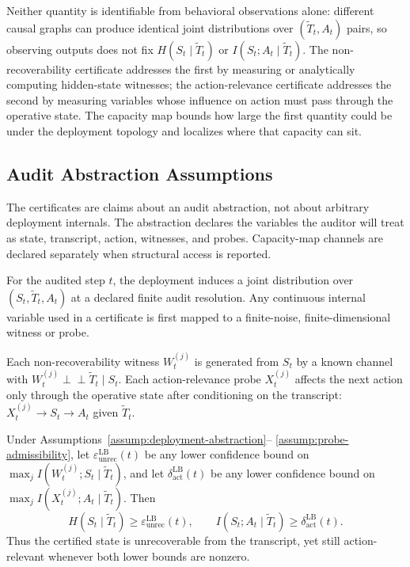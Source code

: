   Neither quantity is identifiable from behavioral observations alone: different
   causal graphs can produce identical joint distributions over $(\tilde T_t,
  A_t)$ pairs, so observing outputs does not fix $H(S_t \mid \tilde T_t)$ or
  $I(S_t; A_t \mid \tilde T_t)$. The non-recoverability certificate addresses
  the first by measuring or analytically computing hidden-state witnesses; the
  action-relevance certificate addresses the second by measuring variables
  whose influence on action must pass through the operative state. The capacity
  map bounds how large the first quantity could be under the deployment
  topology and localizes where that capacity can sit.

  \subsection{Audit Abstraction Assumptions}
  \label{sec:audit-assumptions}

  The certificates are claims about an audit abstraction, not about arbitrary
  deployment internals. The abstraction declares the variables the auditor will
  treat as state, transcript, action, witnesses, and probes. Capacity-map
  channels are declared separately when structural access is reported.

  \begin{assumption}
  \label{assump:deployment-abstraction}
  For the audited step $t$, the deployment induces a joint distribution over
  $(S_t,\tilde T_t,A_t)$ at a declared finite audit resolution. Any continuous
  internal variable used in a certificate is first mapped to a finite-noise,
  finite-dimensional witness or probe.
  \end{assumption}

  \begin{assumption}
  \label{assump:probe-admissibility}
  Each non-recoverability witness $W_t^{(j)}$ is generated from $S_t$ by a known
  channel with $W_t^{(j)}\perp\!\!\!\perp \tilde T_t\mid S_t$. Each
  action-relevance probe $X_t^{(j)}$ affects the next action only through the
  operative state after conditioning on the transcript:
  $X_t^{(j)}\to S_t\to A_t$ given $\tilde T_t$.
  \end{assumption}

  \begin{theorem}
  \label{thm:dual-certificate-validity}
  Under Assumptions~\ref{assump:deployment-abstraction}--
  \ref{assump:probe-admissibility}, let
  $\varepsilon_\mathrm{unrec}^\mathrm{LB}(t)$ be any lower confidence bound on
  $\max_j I(W_t^{(j)};S_t\mid\tilde T_t)$, and let
  $\delta_\mathrm{act}^\mathrm{LB}(t)$ be any lower confidence bound on
  $\max_j I(X_t^{(j)};A_t\mid\tilde T_t)$. Then
  \[
    H(S_t\mid \tilde T_t)\geq
    \varepsilon_\mathrm{unrec}^\mathrm{LB}(t),
    \qquad
    I(S_t;A_t\mid \tilde T_t)\geq
    \delta_\mathrm{act}^\mathrm{LB}(t).
  \]
  Thus the certified state is unrecoverable from the transcript, yet still
  action-relevant whenever both lower bounds are nonzero.
  \end{theorem}

